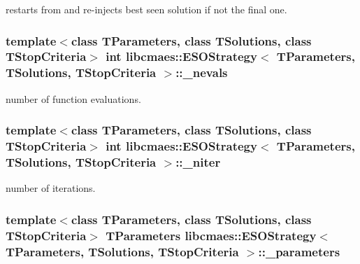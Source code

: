 restarts from and re-\/injects best seen solution if not the final one. \hypertarget{classlibcmaes_1_1ESOStrategy_a19667f1e69856e7cfd6219b63cbaa59d}{
\subsubsection[{\+\_\+nevals}]{\setlength{\rightskip}{0pt plus 5cm}template$<$class T\+Parameters, class T\+Solutions, class T\+Stop\+Criteria$>$ int {\bf libcmaes\+::\+E\+S\+O\+Strategy}$<$ T\+Parameters, T\+Solutions, T\+Stop\+Criteria $>$\+::\+\_\+nevals\hspace{0.3cm}{\ttfamily [protected]}}}\label{classlibcmaes_1_1ESOStrategy_a19667f1e69856e7cfd6219b63cbaa59d}
number of function evaluations. \hypertarget{classlibcmaes_1_1ESOStrategy_aaf5c063558da34826ea1f976423ccfbb}{
\subsubsection[{\+\_\+niter}]{\setlength{\rightskip}{0pt plus 5cm}template$<$class T\+Parameters, class T\+Solutions, class T\+Stop\+Criteria$>$ int {\bf libcmaes\+::\+E\+S\+O\+Strategy}$<$ T\+Parameters, T\+Solutions, T\+Stop\+Criteria $>$\+::\+\_\+niter\hspace{0.3cm}{\ttfamily [protected]}}}\label{classlibcmaes_1_1ESOStrategy_aaf5c063558da34826ea1f976423ccfbb}
number of iterations. \hypertarget{classlibcmaes_1_1ESOStrategy_a295e49238ceef8f11b3fb35296a8364a}{
\subsubsection[{\+\_\+parameters}]{\setlength{\rightskip}{0pt plus 5cm}template$<$class T\+Parameters, class T\+Solutions, class T\+Stop\+Criteria$>$ T\+Parameters {\bf libcmaes\+::\+E\+S\+O\+Strategy}$<$ T\+Parameters, T\+Solutions, T\+Stop\+Criteria $>$\+::\+\_\+parameters\hspace{0.3cm}{\ttfamily [protected]}}}\label{classlibcmaes_1_1ESOStrategy_a295e49238ceef8f11b3fb35296a8364a}
